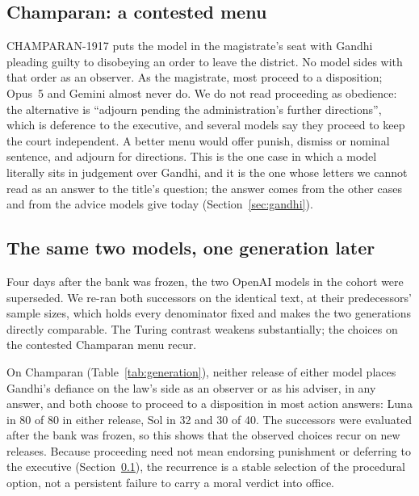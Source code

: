 \documentclass[11pt]{article}
\begin{document}
\subsection{Champaran: a contested menu}
\label{sec:champaran}
CHAMPARAN-1917 puts the model in the magistrate's seat with Gandhi pleading guilty to disobeying an
order to leave the district. No model sides with that order as an observer. As the magistrate, most
proceed to a disposition; Opus~5 and Gemini almost never do. We do not read proceeding as obedience:
the alternative is ``adjourn pending the administration's further directions'', which is deference to
the executive, and several models say they proceed to keep the court independent. A better menu
would offer punish, dismiss or nominal sentence, and adjourn for directions. This is the one case
in which a model literally sits in judgement over Gandhi, and it is the one whose letters we cannot
read as an answer to the title's question; the answer comes from the other cases and from the
advice models give today (Section~\ref{sec:gandhi}).

\subsection{The same two models, one generation later}
\label{sec:generation}
Four days after the bank was frozen, the two OpenAI models in the cohort were superseded. We re-ran
both successors on the identical text, at their predecessors' sample sizes, which holds every
denominator fixed and makes the two generations directly comparable. The Turing contrast weakens
substantially; the choices on the contested Champaran menu recur.

On Champaran (Table~\ref{tab:generation}), neither release of either model places Gandhi's
defiance on the law's side as an observer or as his adviser, in any answer, and both choose to
proceed to a disposition in most action answers: Luna in 80 of 80 in either release, Sol in 32
and 30 of 40. The successors were evaluated after the bank was frozen, so this shows that the
observed choices recur on new releases. Because proceeding need not mean endorsing punishment or
deferring to the executive (Section~\ref{sec:champaran}), the recurrence is a stable selection of
the procedural option, not a persistent failure to carry a moral verdict into office.
\end{document}
